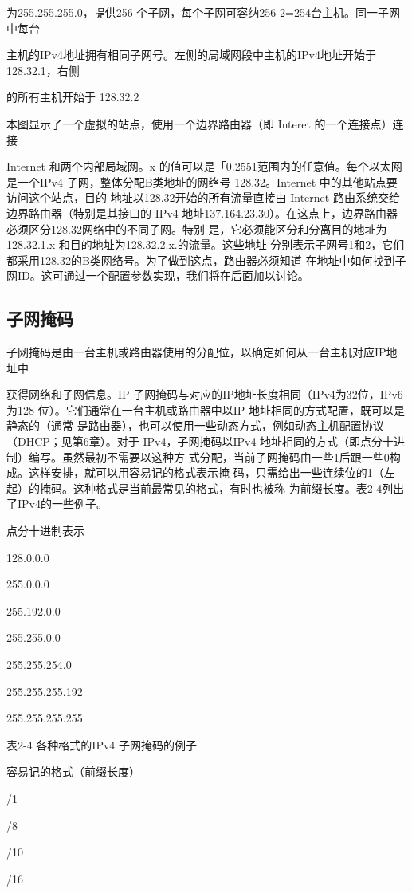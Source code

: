 为255.255.255.0，提供256 个子网，每个子网可容纳256-2=254台主机。同一子网中每台

主机的IPv4地址拥有相同子网号。左侧的局域网段中主机的IPv4地址开始于 128.32.1，右侧

的所有主机开始于 128.32.2

本图显示了一个虚拟的站点，使用一个边界路由器（即 Interet 的一个连接点）连接

Internet 和两个内部局域网。x 的值可以是「0.2551范围内的任意值。每个以太网是一个IPv4
子网，整体分配B类地址的网络号 128.32。Internet 中的其他站点要访问这个站点，目的
地址以128.32开始的所有流量直接由 Internet 路由系统交给边界路由器（特别是其接口的
IPv4 地址137.164.23.30）。在这点上，边界路由器必须区分128.32网络中的不同子网。特别
是，它必须能区分和分离目的地址为128.32.1.x 和目的地址为128.32.2.x.的流量。这些地址
分别表示子网号1和2，它们都采用128.32的B类网络号。为了做到这点，路由器必须知道
在地址中如何找到子网ID。这可通过一个配置参数实现，我们将在后面加以讨论。

\subsection{子网掩码}
子网掩码是由一台主机或路由器使用的分配位，以确定如何从一台主机对应IP地址中

获得网络和子网信息。IP 子网掩码与对应的IP地址长度相同（IPv4为32位，IPv6 为128
位）。它们通常在一台主机或路由器中以IP 地址相同的方式配置，既可以是静态的（通常
是路由器），也可以使用一些动态方式，例如动态主机配置协议（DHCP；见第6章）。对于
IPv4，子网掩码以IPv4 地址相同的方式（即点分十进制）编写。虽然最初不需要以这种方
式分配，当前子网掩码由一些1后跟一些0构成。这样安排，就可以用容易记的格式表示掩
码，只需给出一些连续位的1（左起）的掩码。这种格式是当前最常见的格式，有时也被称
为前缀长度。表2-4列出了IPv4的一些例子。

点分十进制表示

128.0.0.0

255.0.0.0

255.192.0.0

255.255.0.0

255.255.254.0

255.255.255.192

255.255.255.255

表2-4 各种格式的IPv4 子网掩码的例子

容易记的格式（前缀长度）

/1

/8

/10

/16

